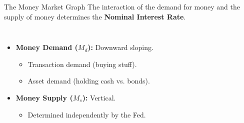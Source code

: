 \documentclass[aspectratio=169]{beamer}
\begin{document}
\begin{frame}{The Money Market Graph}
    The interaction of the demand for money and the supply of money determines the \textbf{Nominal Interest Rate}.

    \begin{columns}
        \begin{itemize}
            \item \textbf{Money Demand ($M_d$):} Downward sloping.
            \begin{itemize}
                \item Transaction demand (buying stuff).
                \item Asset demand (holding cash vs. bonds).
            \end{itemize}
            \item \textbf{Money Supply ($M_s$):} Vertical.
            \begin{itemize}
                \item Determined independently by the Fed.
            \end{itemize}
        \end{itemize}

    \end{columns}
\end{frame}
\end{document}
